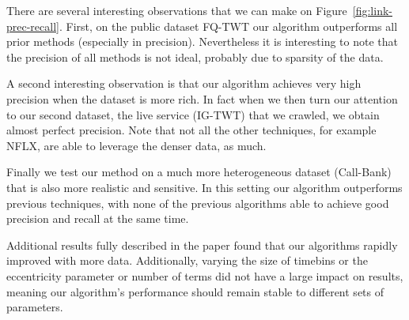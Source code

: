 There are several interesting observations that we can make on Figure~\ref{fig:link-prec-recall}. 
First, on the public dataset FQ-TWT our algorithm outperforms all prior methods (especially in precision). 
Nevertheless it is interesting to note that the precision of all methods is not ideal, probably due to sparsity of the data.

A second interesting observation is that our algorithm achieves very high precision when the dataset is more rich. 
In fact when we then turn our attention to our second dataset, the live service (IG-TWT) that we crawled, we obtain almost perfect precision. 
Note that not all the other techniques, for example NFLX, are able to leverage the denser data, as much.

Finally we test our method on a much more heterogeneous dataset (Call-Bank) that is also more realistic and sensitive. 
In this setting our algorithm outperforms previous techniques, with none of the previous algorithms able to achieve good precision and recall at the same time. 

Additional results fully described in the paper found that our algorithms rapidly improved with more data.
Additionally, varying the size of timebins or the eccentricity parameter or number of terms did not have a large impact on results, meaning our algorithm's performance should remain stable to different sets of parameters.

